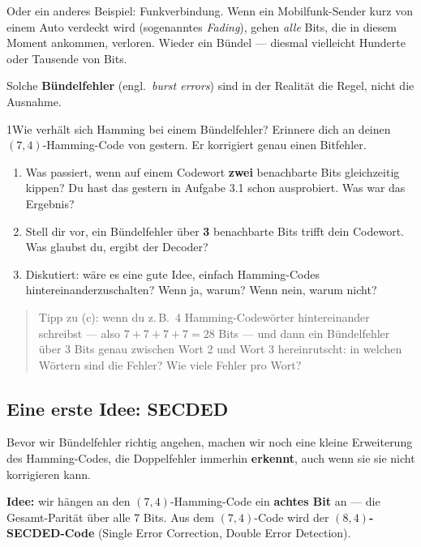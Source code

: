 Oder ein anderes Beispiel: Funkverbindung. Wenn ein Mobilfunk-Sender
kurz von einem Auto verdeckt wird (sogenanntes \emph{Fading}), gehen
\emph{alle} Bits, die in diesem Moment ankommen, verloren. Wieder ein
Bündel — diesmal vielleicht Hunderte oder Tausende von Bits.

Solche \textbf{Bündelfehler} (engl.\ \emph{burst errors}) sind in der
Realität die Regel, nicht die Ausnahme.

\begin{bleistiftuebung}{1}{Wie verhält sich Hamming bei einem Bündelfehler?}
Erinnere dich an deinen $(7,4)$-Hamming-Code von gestern. Er
korrigiert genau einen Bitfehler.

\begin{enumerate}[label=(\alph*), leftmargin=*]
\item Was passiert, wenn auf einem Codewort \textbf{zwei} benachbarte
  Bits gleichzeitig kippen? Du hast das gestern in Aufgabe 3.1 schon
  ausprobiert. Was war das Ergebnis?
\item Stell dir vor, ein Bündelfehler über \textbf{3} benachbarte Bits
  trifft dein Codewort. Was glaubst du, ergibt der Decoder?
\item Diskutiert: wäre es eine gute Idee, einfach Hamming-Codes
  hintereinanderzuschalten? Wenn ja, warum? Wenn nein, warum nicht?
\end{enumerate}

\begin{quote}
Tipp zu (c): wenn du z.\,B.\ 4 Hamming-Codewörter hintereinander
schreibst — also $7+7+7+7 = 28$ Bits — und dann ein Bündelfehler über
3 Bits genau zwischen Wort 2 und Wort 3 hereinrutscht: in welchen
Wörtern sind die Fehler? Wie viele Fehler pro Wort?
\end{quote}
\end{bleistiftuebung}

\subsection*{Eine erste Idee: SECDED}

Bevor wir Bündelfehler richtig angehen, machen wir noch eine kleine
Erweiterung des Hamming-Codes, die Doppelfehler immerhin
\textbf{erkennt}, auch wenn sie sie nicht korrigieren kann.

\textbf{Idee:} wir hängen an den $(7,4)$-Hamming-Code ein
\textbf{achtes Bit} an — die Gesamt-Parität über alle 7 Bits. Aus dem
$(7,4)$-Code wird der \textbf{$(8,4)$-SECDED-Code} (Single Error
Correction, Double Error Detection).

